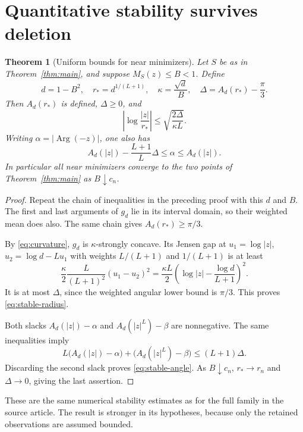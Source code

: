 \documentclass[11pt]{article}
\newtheorem{theorem}{Theorem}[section]
\newcommand{\Arg}{\operatorname{Arg}}
\begin{document}
\section{Quantitative stability survives deletion}

\begin{theorem}[Uniform bounds for near minimizers]\label{thm:stability}
Let $S$ be as in Theorem~\ref{thm:main}, and suppose $M_S(z)\le B<1$. Define
\[
 d=1-B^2,\quad r_*=d^{1/(L+1)},\quad
 \kappa=\frac{\sqrt d}{B},\quad
 \Delta=A_d(r_*)-\frac\pi3.
\]
Then $A_d(r_*)$ is defined, $\Delta\ge0$, and
\begin{equation}\label{eq:stable-radius}
 \left|\log\frac{|z|}{r_*}\right|
 \le\sqrt{\frac{2\Delta}{\kappa L}}.
\end{equation}
Writing $\alpha=|\Arg(-z)|$, one also has
\begin{equation}\label{eq:stable-angle}
 A_d(|z|)-\frac{L+1}{L}\Delta\le\alpha\le A_d(|z|).
\end{equation}
In particular all near minimizers converge to the two points of Theorem~\ref{thm:main} as $B\downarrow c_n$.
\end{theorem}

\begin{proof}
Repeat the chain of inequalities in the preceding proof with this $d$ and $B$. The first and last arguments of $g_d$ lie in its interval domain, so their weighted mean does also. The same chain gives $A_d(r_*)\ge\pi/3$.

By \eqref{eq:curvature}, $g_d$ is $\kappa$-strongly concave. Its Jensen gap at $u_1=\log|z|$, $u_2=\log d-Lu_1$ with weights $L/(L+1)$ and $1/(L+1)$ is at least
\[
 \frac{\kappa}{2}\frac{L}{(L+1)^2}(u_1-u_2)^2
 =\frac{\kappa L}{2}\left(\log|z|-\frac{\log d}{L+1}\right)^2.
\]
It is at most $\Delta$, since the weighted angular lower bound is $\pi/3$. This proves \eqref{eq:stable-radius}.

Both slacks $A_d(|z|)-\alpha$ and $A_d(|z|^L)-\beta$ are nonnegative. The same inequalities imply
\[
 L\bigl(A_d(|z|)-\alpha\bigr)
 +\bigl(A_d(|z|^L)-\beta\bigr)\le(L+1)\Delta.
\]
Discarding the second slack proves \eqref{eq:stable-angle}. As $B\downarrow c_n$, $r_*\to r_n$ and $\Delta\to0$, giving the last assertion.
\end{proof}

These are the same numerical stability estimates as for the full family in the source article. The result is stronger in its hypotheses, because only the retained observations are assumed bounded.
\end{document}
